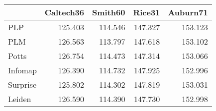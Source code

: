 \begin{tabular}{lrrrr}
\toprule
{} & Caltech36 & Smith60 &  Rice31 & Auburn71 \\
\midrule
PLP      &   125.403 & 114.546 & 147.327 &  153.123 \\
PLM      &   126.563 & 113.797 & 147.618 &  153.102 \\
Potts    &   126.754 & 114.473 & 147.314 &  153.066 \\
Infomap  &   126.390 & 114.732 & 147.925 &  152.996 \\
Surprise &   125.802 & 114.302 & 147.819 &  153.031 \\
Leiden   &   126.590 & 114.390 & 147.730 &  152.998 \\
\bottomrule
\end{tabular}

